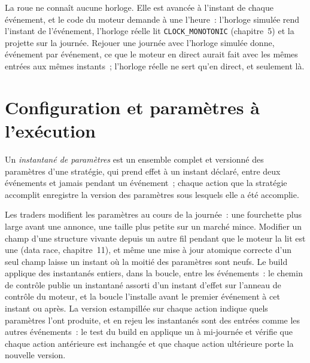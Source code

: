 \label{lst:ll:the-strategy-engine:wheel}

La roue ne connaît aucune horloge. Elle est avancée à l'instant de chaque événement, et le code du moteur demande à une  l'heure~:
l'horloge simulée rend l'instant de l'événement, l'horloge réelle lit \texttt{CLOCK\_MONOTONIC} (chapitre~5) et la projette sur la
journée. Rejouer une journée avec l'horloge simulée donne, événement par événement, ce que le moteur en direct aurait fait avec les mêmes entrées
aux mêmes instants~; l'horloge réelle ne sert qu'en direct, et seulement là.

\label{lst:ll:the-strategy-engine:clock}

\section{Configuration et paramètres à l'exécution}

\begin{definition}\label{def:ll:the-strategy-engine:snapshot}
Un \emph{instantané de paramètres} est un ensemble complet et versionné des paramètres d'une stratégie, qui prend effet à un instant déclaré, entre
deux événements et jamais pendant un événement~; chaque action que la stratégie accomplit enregistre la version des paramètres sous lesquels elle a été accomplie.
\end{definition}

Les traders modifient les paramètres au cours de la journée~: une fourchette plus large avant une annonce, une taille plus petite sur un marché mince. Modifier un champ d'une
structure vivante depuis un autre fil pendant que le moteur la lit est une  (data race, chapitre~11), et même une mise à jour atomique correcte d'un
seul champ laisse un instant où la moitié des paramètres sont neufs. Le build applique des instantanés entiers, dans la boucle, entre les événements~:
le chemin de contrôle publie un instantané assorti d'un instant d'effet sur l'anneau de contrôle du moteur, et la boucle l'installe avant le
premier événement à cet instant ou après. La version estampillée sur chaque action indique quels paramètres l'ont produite, et en rejeu les
instantanés sont des entrées comme les autres événements~: le test du build en applique un à mi-journée et vérifie que chaque action
antérieure est inchangée et que chaque action ultérieure porte la nouvelle version.

